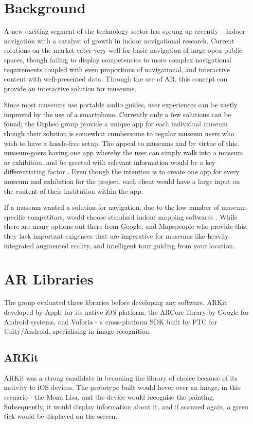 \section{Background}
A new exciting segment of the technology sector has sprung up recently – indoor navigation with a catalyst of growth in indoor navigational research. Current solutions on the market cater very well for basic navigation of large open public spaces, though failing to display competencies to more complex navigational requirements coupled with even proportions of navigational, and interactive content with well-presented data. Through the use of AR, this concept can provide an interactive solution for museums.

Since most museums use portable audio guides, user experiences can be vastly improved by the use of a smartphone. Currently only a few solutions can be found; the Orpheo group provide a unique app for each individual museum though their solution is somewhat cumbersome to regular museum users who wish to have a hassle-free setup. The appeal to museums and by virtue of this, museum-goers having one app whereby the user can simply walk into a museum or exhibition, and be greeted with relevant information would be a key differentiating factor \cite{microsoft}. Even though the intention is to create one app for every museum and exhibition for the project, each client would have a large input on the content of their institution within the app. 

If a museum wanted a solution for navigation, due to the low number of museum-specific competitors, would choose standard indoor mapping softwares \cite{murphy}. While there are many options out there from Google, and Mapspeople \cite{mapspeople} who provide this, they lack important exigences that are imperative for museums like heavily integrated augmented reality, and intelligent tour guiding from your location.

\section{AR Libraries}
The group evaluated three libraries before developing any software. ARKit developed by Apple for its native iOS platform, the ARCore library by Google for Android systems, and Vuforia - a cross-platform SDK built by PTC for Unity/Android, specialising in image recognition.

\subsection{ARKit}
ARKit was a strong candidate in becoming the library of choice because of its nativity to iOS devices. The prototype built would hover over an image, in this scenario - the Mona Lisa, and the device would recognise the painting. Subsequently, it would display information about it, and if scanned again, a green tick would be displayed on the screen.

